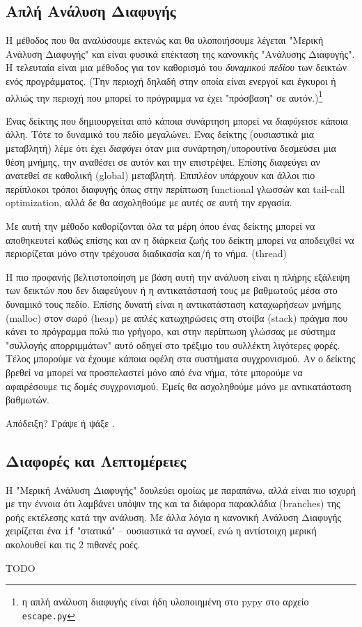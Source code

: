\subsection{Απλή Ανάλυση Διαφυγής}

Η μέθοδος που θα αναλύσουμε εκτενώς και θα υλοποιήσουμε λέγεται "Μερική
Ανάλυση Διαφυγής" και είναι φυσικά επέκταση της κανονικής "Ανάλυσης Διαφυγής".
Η τελευταία είναι μια μέθοδος για τον καθορισμό του \textit{δυναμικού πεδίου}
των δεικτών ενός προγράμματος. (Την περιοχή δηλαδή στην οποία είναι ενεργοί
και έγκυροι ή αλλιώς την περιοχή που μπορεί το πρόγραμμα να έχει "πρόσβαση" σε
αυτόν.)\footnote{η απλή ανάλυση διαφυγής είναι ήδη υλοποιημένη στο pypy στο
αρχείο \texttt{escape.py}}

Ένας δείκτης που δημιουργείται από κάποια συνάρτηση μπορεί να
\textit{διαφύγει}σε κάποια άλλη. Τότε το δυναμικό του πεδίο μεγαλώνει. Ένας
δείκτης (ουσιαστικά μια μεταβλητή) λέμε ότι έχει \textit{διαφύγει} όταν μια
συνάρτηση/υπορουτίνα δεσμεύσει μια θέση μνήμης, την αναθέσει σε αυτόν και την
επιστρέψει. Επίσης διαφεύγει αν ανατεθεί σε καθολική (global) μεταβλητή.
Επιπλέον υπάρχουν και άλλοι πιο περίπλοκοι τρόποι διαφυγής όπως στην περίπτωση
functional γλωσσών και tail-call optimization, αλλά δε θα ασχοληθούμε με αυτές
σε αυτή την εργασία.

Με αυτή την μέθοδο καθορίζονται όλα τα μέρη όπου ένας δείκτης μπορεί να
αποθηκευτεί καθώς επίσης και αν η διάρκεια ζωής του δείκτη μπορεί να αποδειχθεί
να περιορίζεται μόνο στην τρέχουσα διαδικασία και/ή το νήμα. (thread)

Η πιο προφανής βελτιστοποίηση με βάση αυτή την ανάλυση είναι η πλήρης εξάλειψη
των δεικτών που δεν διαφεύγουν ή η αντικατάστασή τους με βαθμωτούς μέσα στο
δυναμικό τους πεδίο. Επίσης δυνατή είναι η αντικατάσταση καταχωρήσεων μνήμης
(malloc) στον σωρό (heap) με απλές κατωχηρώσεις στη στοίβα (stack) πράγμα που
κάνει το πρόγραμμα πολύ πιο γρήγορο, και στην περίπτωση γλώσσας με σύστημα
"συλλογής απορριμμάτων" αυτό οδηγεί στο τρέξιμο του συλλέκτη λιγότερες φορές.
Τέλος μπορούμε να έχουμε κάποια οφέλη στα συστήματα συγχρονισμού. Αν ο δείκτης
βρεθεί να μπορεί να προσπελαστεί μόνο από ένα νήμα, τότε μπορούμε να 
αφαιρέσουμε τις δομές συγχρονισμού. Εμείς θα ασχοληθούμε μόνο με αντικατάσταση 
βαθμωτών.

Απόδειξη? Γράψε ή ψάξε\cite{proof} \cite{complexity}.

\subsection{Διαφορές και Λεπτομέρειες}

Η "Μερική Ανάλυση Διαφυγής" δουλεύει ομοίως με παραπάνω, αλλά είναι πιο ισχυρή
με την έννοια ότι λαμβάνει υπόψιν της και τα διάφορα παρακλάδια (branches) της
ροής εκτέλεσης κατά την ανάλυση. Με άλλα λόγια η κανονική Ανάλυση Διαφυγής
χειρίζεται ένα \texttt{if} "στατικά" – ουσιαστικά τα αγνοεί, ενώ η αντίστοιχη
μερική ακολουθεί και τις 2 πιθανές ροές.

TODO
